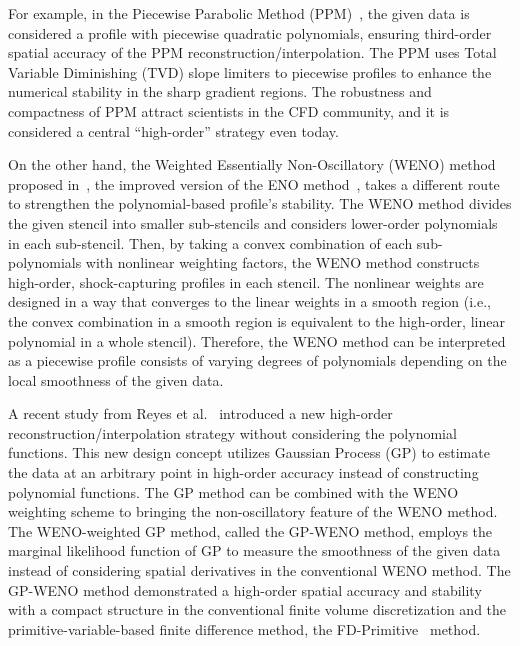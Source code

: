 For example, in the Piecewise Parabolic Method (PPM)~\cite{woodward1984numerical},
the given data is considered a profile with piecewise quadratic polynomials,
ensuring third-order spatial accuracy of the PPM reconstruction/interpolation.
The PPM uses Total Variable Diminishing (TVD) slope limiters to piecewise profiles
to enhance the numerical stability in the sharp gradient regions.
The robustness and compactness of PPM attract scientists in the CFD community,
and it is considered a central ``high-order'' strategy even today.

On the other hand, the Weighted Essentially Non-Oscillatory (WENO) method proposed in~\cite{jiang1996efficient},
the improved version of the ENO method~\cite{harten1987uniformly},
takes a different route to strengthen the polynomial-based profile's stability.
The WENO method divides the given stencil into smaller sub-stencils and considers
lower-order polynomials in each sub-stencil.
Then, by taking a convex combination of each sub-polynomials with nonlinear weighting factors,
the WENO method constructs high-order, shock-capturing profiles in each stencil.
The nonlinear weights are designed in a way that converges to the linear weights in a smooth region
(i.e., the convex combination in a smooth region is equivalent to the high-order, linear polynomial in a whole stencil).
Therefore, the WENO method can be interpreted as a piecewise profile
consists of varying degrees of polynomials depending on the local smoothness of the given data.

A recent study from Reyes et al.~\cite{reyes2018new,reyes2019variable} introduced
a new high-order reconstruction/interpolation strategy without considering the polynomial functions.
This new design concept utilizes Gaussian Process (GP) to estimate the data
at an arbitrary point in high-order accuracy instead of constructing polynomial functions.
The GP method can be combined with the WENO weighting scheme to bringing
the non-oscillatory feature of the WENO method.
The WENO-weighted GP method, called the GP-WENO method,
employs the marginal likelihood function of GP to measure the smoothness of the given data
instead of considering spatial derivatives in the conventional WENO method.
The GP-WENO method demonstrated a high-order spatial accuracy and stability with a compact structure
in the conventional finite volume discretization and
the primitive-variable-based finite difference method, the FD-Primitive~\cite{del2003efficient,del2007echo,chen2016fifth} method.

